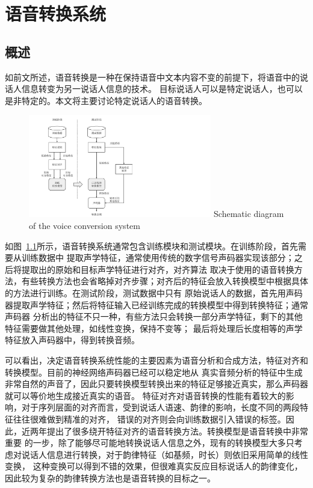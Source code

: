 \chapter{语音转换系统}

\section{概述}

如前文所述，语音转换是一种在保持语音中文本内容不变的前提下，将语音中的说话人信息转变为另一说话人信息的技术。
目标说话人可以是特定说话人，也可以是非特定的。本文将主要讨论特定说话人的语音转换。

\begin{figure}[!htp]
    \centering
    \includegraphics[width=8cm,trim=50 0 310 10,clip]{figure/2_vc_basis.pdf}
    {Schematic diagram of the voice conversion system}
    \label{fig:vc_basis}
\end{figure}

如图~\ref{fig:vc_basis}所示，语音转换系统通常包含训练模块和测试模块。在训练阶段，首先需要从训练数据中
提取声学特征，通常使用传统的数字信号声码器实现该部分；之后将提取出的原始和目标声学特征进行对齐，对齐算法
取决于使用的语音转换方法，有些转换方法也会省略掉对齐步骤；对齐后的特征会放入转换模型中根据具体的方法进行训练。在测试阶段，测试数据中只有
原始说话人的数据，首先用声码器提取声学特征；然后将特征输入已经训练完成的转换模型中得到转换特征；通常声码器
分析出的特征不只一种，有些方法只会转换一部分声学特征，剩下的其他特征需要做其他处理，如线性变换，保持不变等；
最后将处理后长度相等的声学特征放入声码器中，得到转换音频。

可以看出，决定语音转换系统性能的主要因素为语音分析和合成方法，特征对齐和转换模型。目前的神经网络声码器已经可以稳定地从
真实音频分析的特征中生成非常自然的声音了，因此只要转换模型转换出来的特征足够接近真实，那么声码器就可以等价地生成接近真实的语音。
特征对齐对语音转换的性能有着较大的影响，对于序列层面的对齐而言，受到说话人语速、韵律的影响，长度不同的两段特征往往很难做到精准的对齐，
错误的对齐则会向训练数据引入错误的标签。因此，近两年提出了很多绕开特征对齐的语音转换方法。转换模型是语音转换中非常重要
的一步，除了能够尽可能地转换说话人信息之外，现有的转换模型大多只考虑对说话人信息进行转换，对于韵律特征（如基频，时长）则依旧采用简单的线性变换，
这种变换可以得到不错的效果，但很难真实反应目标说话人的韵律变化，因此较为复杂的韵律转换方法也是语音转换的目标之一。

